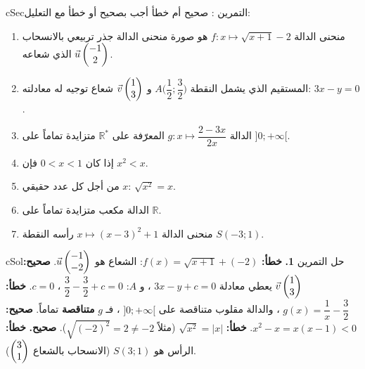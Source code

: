 \documentclass[12pt,a4paper]{article}
\newenvironment{BOX}[2]{\begin{otherlanguage}{english}\begin{arbox}{#1}{#2}}{\end{arbox}\end{otherlanguage}}
\newcounter{exo}
\newenvironment{tamrin}[1]{\stepcounter{exo}\begin{BOX}{cSec}{التمرين \theexo: #1}}{\end{BOX}}
\newenvironment{hal}{\Needspace{12\baselineskip}\begin{otherlanguage}{english}\begin{arbox}[breakable]{cSol}{حل التمرين \theexo}}{\end{arbox}\end{otherlanguage}}
\newcommand{\R}{\mathbb{R}}
\begin{document}
\begin{tamrin}{صحيح أم خطأ}
أجب بصحيح أو خطأ مع التعليل:
\begin{enumerate}
\item منحنى الدالة $f:x\mapsto\sqrt{x+1}-2$ هو صورة منحنى الدالة جذر تربيعي بالانسحاب الذي شعاعه $\vec u\begin{pmatrix}-1\\2\end{pmatrix}$.
\item المستقيم الذي يشمل النقطة $A\Big(\dfrac12;\dfrac32\Big)$ و $\vec v\begin{pmatrix}1\\3\end{pmatrix}$ شعاع توجيه له معادلته: $3x-y=0$.
\item الدالة $g:x\mapsto\dfrac{2-3x}{2x}$ المعرّفة على $\R^*$ متزايدة تماماً على $]0;+\infty[$.
\item إذا كان $0<x<1$ فإن $x^2<x$.
\item من أجل كل عدد حقيقي $x$: $\sqrt{x^2}=x$.
\item الدالة مكعب متزايدة تماماً على $\R$.
\item منحنى الدالة $x\mapsto(x-3)^2+1$ رأسه النقطة $S(-3;1)$.
\end{enumerate}
\end{tamrin}
\begin{hal}
\textbf{1.} \textbf{خطأ:} $f(x)=\sqrt{x+1}+(-2)$: الشعاع هو $\vec u\begin{pmatrix}-1\\-2\end{pmatrix}$.
 \textbf{صحيح:} $\vec v\begin{pmatrix}1\\3\end{pmatrix}$ يعطي معادلة $3x-y+c=0$ ، و $A$: $\dfrac32-\dfrac32+c=0$ ، $c=0$.
 \textbf{خطأ:} $g(x)=\dfrac1x-\dfrac32$ ، والدالة مقلوب متناقصة على $]0;+\infty[$ ، فـ $g$ \textbf{متناقصة} تماماً.
 \textbf{صحيح:} $x^2-x=x(x-1)<0$.
 \textbf{خطأ:} $\sqrt{x^2}=|x|$ (مثلاً $\sqrt{(-2)^2}=2\ne-2$).
 \textbf{صحيح.}
 \textbf{خطأ:} الرأس هو $S(3;1)$ (الانسحاب بالشعاع $\begin{pmatrix}3\\1\end{pmatrix}$).
\end{hal}
\end{document}

